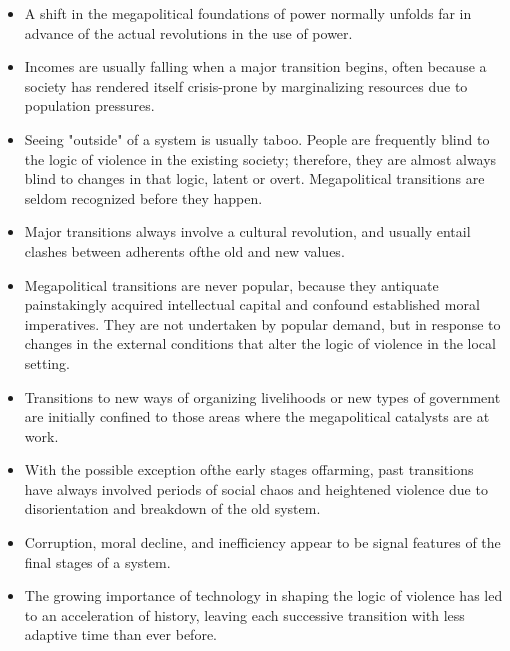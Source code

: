 \begin{paracol}{2}
\switchcolumn*
\begin{itemize}
  \item A shift in the megapolitical foundations of power normally unfolds far in advance of the actual revolutions in the use of power.
  \item Incomes are usually falling when a major transition begins, often because a society has rendered itself crisis-prone by marginalizing resources due to population pressures.
  \item Seeing "outside" of a system is usually taboo. People are frequently blind to the logic of violence in the existing society; therefore, they are almost always blind to changes in that logic, latent or overt. Megapolitical transitions are seldom recognized before they happen.
  \item Major transitions always involve a cultural revolution, and usually entail clashes between adherents ofthe old and new values.
  \item Megapolitical transitions are never popular, because they antiquate painstakingly acquired intellectual capital and confound established moral imperatives. They are not undertaken by popular demand, but in response to changes in the external conditions that alter the logic of violence in the local setting.
  \item Transitions to new ways of organizing livelihoods or new types of government are initially confined to those areas where the megapolitical catalysts are at work.
  \item With the possible exception ofthe early stages offarming, past transitions have always involved periods of social chaos and heightened violence due to disorientation and breakdown of the old system.
  \item Corruption, moral decline, and inefficiency appear to be signal features of the final stages of a system.
  \item The growing importance of technology in shaping the logic of violence has led to an acceleration of history, leaving each successive transition with less adaptive time than ever before.
\end{itemize}


\end{paracol}
